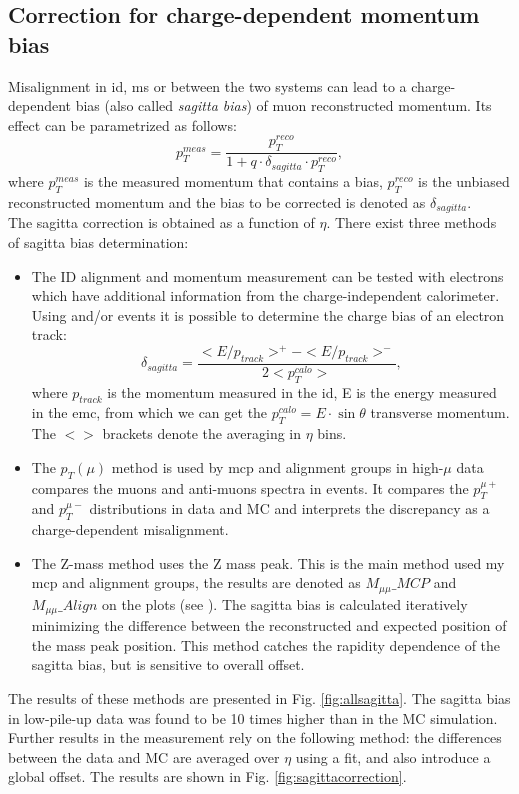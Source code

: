 	\subsection{Correction for charge-dependent momentum bias}
    Misalignment in \gls{id}, \gls{ms} or between the two systems can lead to a charge-dependent bias (also called \textit{sagitta bias}) of muon reconstructed momentum. Its effect can be parametrized as follows:
    \begin{equation}
    	p_T^{meas}=\frac{p_T^{reco}}{1+q\cdot \delta_{sagitta}\cdot p_T^{reco}},
    \end{equation}
    where $p_T^{meas}$ is the measured momentum that contains a bias, $p_T^{reco}$ is the unbiased reconstructed momentum and the bias to be corrected is denoted as $\delta_{sagitta}$.\\
    The sagitta correction is obtained as a function of $\eta$. There exist three methods of sagitta bias determination:
    \begin{itemize}
    	\item The ID alignment and momentum measurement can be tested with electrons which have additional information from the charge-independent calorimeter. Using \Zee and/or \Wenu events it is possible to determine the charge bias of an electron track:
    	\begin{equation}
    		\delta_{sagitta}=\frac{<E/p_{track}>^+-<E/p_{track}>^-}{2<p^{calo}_T>},
    	\end{equation}
    	where $p_{track}$ is the momentum measured in the \gls{id}, E is the energy measured in the \gls{emc}, from which we can get the $p^{calo}_T=E\cdot \sin{\theta}$ transverse momentum. The $<>$ brackets denote the averaging in $\eta$ bins. 
    	\item The $p_T(\mu)$ method is used by \gls{mcp} and alignment groups in high-$\mu$ data compares the muons and anti-muons spectra in \Zmm events. It compares the $p_T^{\mu+}$ and $p_T^{\mu-}$ distributions in data and MC and interprets the discrepancy as a charge-dependent misalignment.
    	\item The Z-mass method uses the Z mass peak. This is the main method used my \gls{mcp} and alignment groups, the results are denoted as $M_{\mu\mu}\_MCP$ and $M_{\mu\mu}\_Align$ on the plots (see \cite{muon_align}). The sagitta bias is calculated iteratively minimizing the difference between the reconstructed and expected position of the \Zmm mass peak position. This method catches the rapidity dependence of the sagitta bias, but is sensitive to overall offset.
    \end{itemize}
	The results of these methods are presented in Fig. \ref{fig:allsagitta}. The sagitta bias in low-pile-up data was found to be 10 times higher than in the MC simulation. Further results in the measurement rely on the following method: the differences between the data and MC are averaged over $\eta$ using a fit, and also introduce a global offset. The results are shown in Fig. \ref{fig:sagittacorrection}.
	
